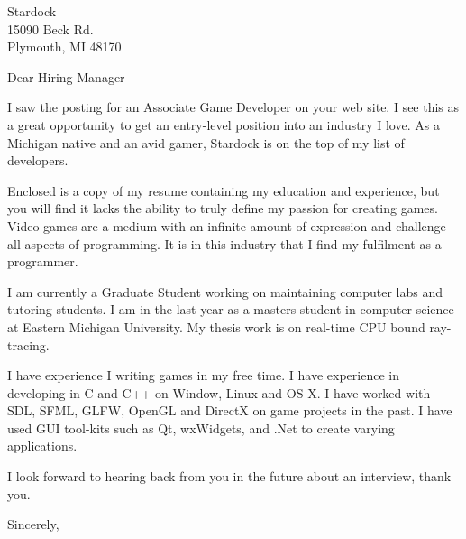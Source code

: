 \documentclass{letter}
\begin{document}
\begin{letter}{ Stardock \\ 15090 Beck Rd. \\ Plymouth, MI 48170 }

\opening{Dear Hiring Manager}

I saw the posting for an Associate Game Developer on your web site.  I see this as a great opportunity to get an entry-level position into an industry I love.  As a Michigan native and an avid gamer, Stardock is on the top of my list of developers.  

Enclosed is a copy of my resume containing my education and experience, but you will find it lacks the ability to truly define my passion for creating games.  Video games are a medium with an infinite amount of expression and challenge all aspects of programming.  It is in this industry that I find my fulfilment as a programmer.

I am currently a Graduate Student working on maintaining computer labs and tutoring students.   I am in the last year as a masters student in computer science at Eastern Michigan University.  My thesis work is on real-time CPU bound ray-tracing.

I have experience I writing games in my free time.  I have experience in developing in C and C++ on Window, Linux and OS X.  I have worked with SDL, SFML, GLFW, OpenGL and DirectX on game projects in the past.  I have used GUI tool-kits such as Qt, wxWidgets, and .Net to create varying applications.

I look forward to hearing back from you in the future about an interview, thank you.

\closing{Sincerely,}
\end{letter}
\end{document}
